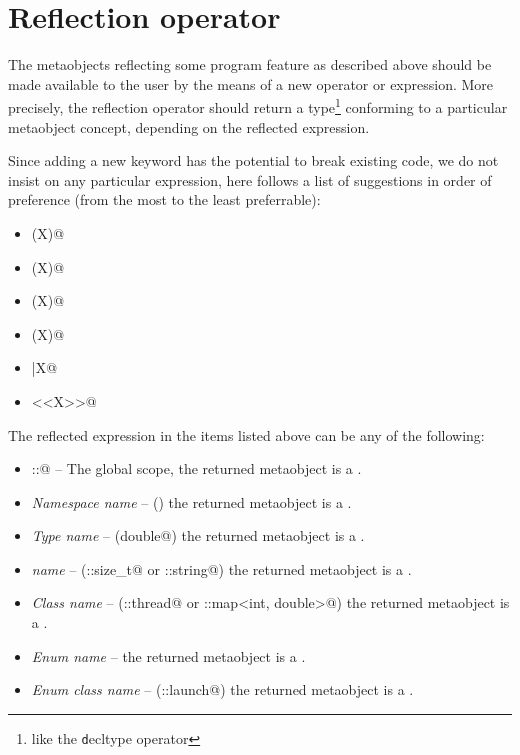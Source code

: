 \section{Reflection operator}
\label{section-reflection-operator}

The metaobjects reflecting some program feature \verb@X@ as
described above should be made available to the user by
the means of a new operator or expression.
More precisely, the reflection operator should return
a type\footnote{like the {\texttt decltype} operator} conforming to a particular
metaobject concept, depending on the reflected expression.

Since adding a new keyword has the potential to break existing code,
we do not insist on any particular expression, here follows a list of suggestions
in order of preference (from the most to the least preferrable):

\begin{itemize}
\item{\verb@mirrored(X)@}
\item{\verb@reflected(X)@}
\item{\verb@reflexpr(X)@}
\item{\verb@constexpr(X)@}
\item{\verb@|X@}
\item{\verb@<<X>>@}
\end{itemize}

The reflected expression \verb@X@ in the items listed above can be any of the following:

\begin{itemize}
\item{\verb@::@} -- The global scope, the returned metaobject is a {}.
\item{{\em Namespace name}} -- (\verb@std@) the returned metaobject is a {}.
\item{{\em Type name}} -- (\verb@long double@) the returned metaobject is a {}.
\item{{\em \verb@typedef@ name}} -- (\verb@std::size_t@ or \verb@std::string@)
     the returned metaobject is a {}.
\item{{\em Class name}} -- (\verb@std::thread@ or \verb@std::map<int, double>@)
     the returned metaobject is a {}.
\item{{\em Enum name}} -- 
     the returned metaobject is a {}.
\item{{\em Enum class name}} -- (\verb@std::launch@)
     the returned metaobject is a {}.
\end{itemize}

